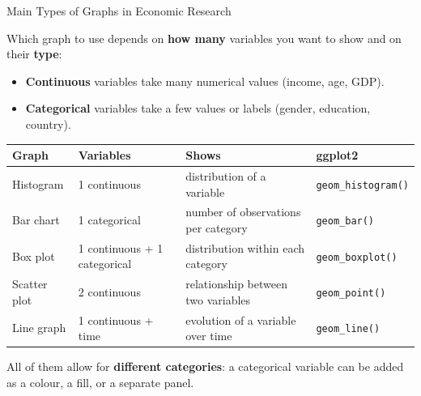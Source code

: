 \documentclass[9pt,aspectratio=169]{beamer}
\begin{document}
\begin{frame}{Main Types of Graphs in Economic Research}
\linespread{1.3}\selectfont

Which graph to use depends on \textbf{how many} variables you want to show and on their \textbf{type}:

\begin{itemize}
  \item \textbf{Continuous} variables take many numerical values (income, age, GDP).
  \item \textbf{Categorical} variables take a few values or labels (gender, education, country).
\end{itemize}

\medskip
\begin{center}
\small
\begin{tabular}{llll}
\toprule
\textbf{Graph} & \textbf{Variables} & \textbf{Shows} & \textbf{ggplot2} \\
\midrule
Histogram    & 1 continuous                 & distribution of a variable          & \texttt{geom\_histogram()} \\
Bar chart    & 1 categorical                & number of observations per category & \texttt{geom\_bar()} \\
Box plot     & 1 continuous + 1 categorical & distribution within each category   & \texttt{geom\_boxplot()} \\
Scatter plot & 2 continuous                 & relationship between two variables  & \texttt{geom\_point()} \\
Line graph   & 1 continuous + time          & evolution of a variable over time   & \texttt{geom\_line()} \\
\bottomrule
\end{tabular}
\end{center}

\medskip
\pause
All of them allow for \textbf{different categories}: a categorical variable can be added as a \color{teal}colour\color{black}, a \color{teal}fill\color{black}, or a \color{teal}separate panel\color{black}.
\end{frame}
\end{document}
